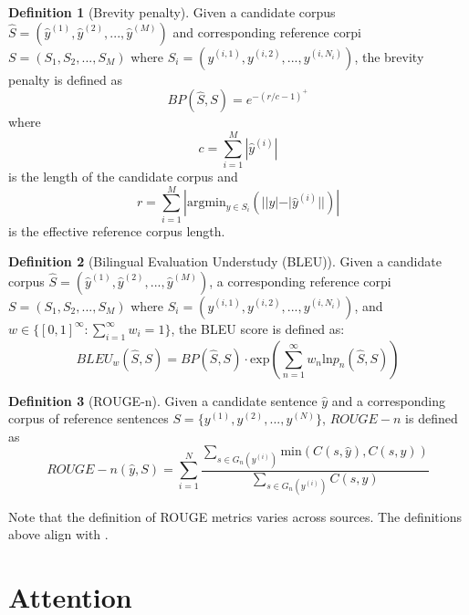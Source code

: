 \documentclass[11pt]{article}
\theoremstyle{definition}
\newtheorem{definition}{Definition}[section]
\begin{document}
\begin{definition}[Brevity penalty] Given a candidate corpus $\hat{S} = (\hat{y}^{(1)}, \hat{y}^{(2)}, ..., \hat{y}^{(M)})$ and corresponding reference corpi $S = (S_1, S_2, ..., S_M)$ where $S_i = (y^{(i,1)}, y^{(i,2)}, ..., y^{(i,N_i)})$, the brevity penalty is defined as
\begin{equation}
BP(\hat{S}, S) = e^{-(r/c-1)^+}
\end{equation}
where
\begin{equation}
c = \sum_{i=1}^M | \hat{y}^{(i)} |
\end{equation}
is the length of the candidate corpus and
\begin{equation}
r = \sum_{i=1}^M | \mathrm{arg} \mathrm{min}_{y \in S_i} \left( | |y| - |\hat{y}^{(i)}| | \right) |
\end{equation}
is the effective reference corpus length.
\end{definition}

\begin{definition}[Bilingual Evaluation Understudy (BLEU)] Given a candidate corpus $\hat{S} = (\hat{y}^{(1)}, \hat{y}^{(2)}, ..., \hat{y}^{(M)})$, a corresponding reference corpi $S = (S_1, S_2, ..., S_M)$ where $S_i = (y^{(i,1)}, y^{(i,2)}, ..., y^{(i,N_i)})$, and $w \in \{ \left[ 0, 1\right]^{\infty} : \sum_{i=1}^{\infty} w_i = 1 \}$, the BLEU score is defined as:
\begin{equation}
BLEU_w (\hat{S}, S) = BP (\hat{S}, S) \cdot \mathrm{exp} \left( \sum_{n=1}^{\infty} w_n \mathrm{ln} p_n ( \hat{S} , S) \right)
\end{equation}
\end{definition}

\begin{definition}[ROUGE-n] Given a candidate sentence $\hat{y}$ and a corresponding corpus of reference sentences $S = \{ y^{(1)}, y^{(2)}, ..., y^{(N)} \}$, $ROUGE-n$ is defined as
\begin{equation}
ROUGE-n (\hat{y}, S) = \sum_{i=1}^N \frac{ \sum_{s \in G_n(y^{(i)})} \mathrm{min} (C(s,\hat{y}), C(s, y) )}{ \sum_{s \in G_n(y^{(i)})} C(s,y)}
\end{equation}
\end{definition}

Note that the definition of ROUGE metrics varies across sources. The definitions above align with \cite{schluter-2017-limits}.

\section{Attention}
\end{document}
